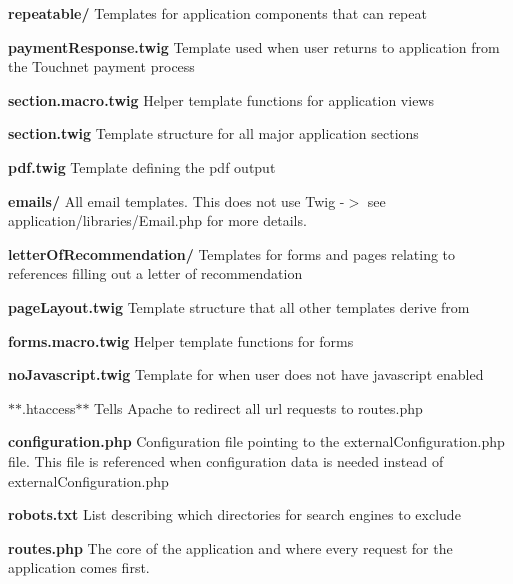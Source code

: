 \begin{DoxyItemize}
\begin{DoxyItemize}
\begin{DoxyItemize}
\begin{DoxyItemize}
\begin{DoxyItemize}
\item {\bfseries repeatable/} Templates for application components that can repeat
\item {\bfseries payment\-Response.\-twig} Template used when user returns to application from the Touchnet payment process
\item {\bfseries section.\-macro.\-twig} Helper template functions for application views
\item {\bfseries section.\-twig} Template structure for all major application sections
\item {\bfseries pdf.\-twig} Template defining the pdf output
\end{DoxyItemize}
\end{DoxyItemize}


\begin{DoxyItemize}
\item {\bfseries emails/} All email templates. This does not use Twig -\/$>$ see application/libraries/\-Email.\-php for more details.
\item {\bfseries letter\-Of\-Recommendation/} Templates for forms and pages relating to references filling out a letter of recommendation
\item {\bfseries page\-Layout.\-twig} Template structure that all other templates derive from
\item {\bfseries forms.\-macro.\-twig} Helper template functions for forms
\item {\bfseries no\-Javascript.\-twig} Template for when user does not have javascript enabled
\end{DoxyItemize}
\end{DoxyItemize}
\end{DoxyItemize}


\begin{DoxyItemize}
\item $\ast$$\ast$.htaccess$\ast$$\ast$ Tells Apache to redirect all url requests to routes.\-php
\item {\bfseries configuration.\-php} Configuration file pointing to the external\-Configuration.\-php file. This file is referenced when configuration data is needed instead of external\-Configuration.\-php
\item {\bfseries robots.\-txt} List describing which directories for search engines to exclude
\item {\bfseries routes.\-php} The core of the application and where every request for the application comes first.
\end{DoxyItemize}
\end{DoxyItemize}



